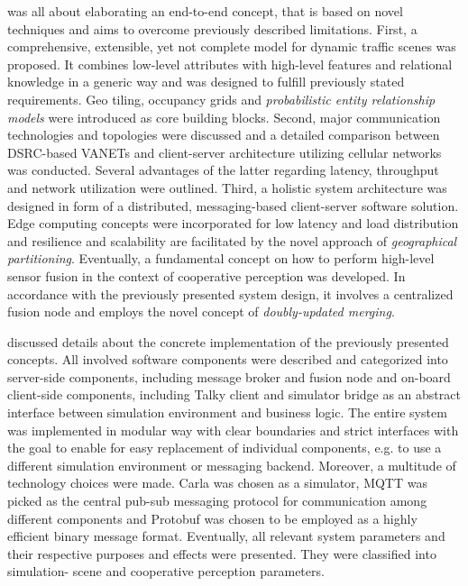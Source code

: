  was all about elaborating an end-to-end concept, that is based on novel techniques and aims to overcome previously described limitations. First, a comprehensive, extensible, yet not complete model for dynamic traffic scenes was proposed. It combines low-level attributes with high-level features and relational knowledge in a generic way and was designed to fulfill previously stated requirements. Geo tiling, occupancy grids and \textit{probabilistic entity relationship models} were introduced as core building blocks.
Second, major communication technologies and topologies were discussed and a detailed comparison between DSRC-based VANETs and client-server architecture utilizing cellular networks was conducted. Several advantages of the latter regarding latency, throughput and network utilization were outlined.
Third, a holistic system architecture was designed in form of a distributed, messaging-based client-server software solution. Edge computing concepts were incorporated for low latency and load distribution and resilience and scalability are facilitated by the novel approach of \textit{geographical partitioning}.
Eventually, a fundamental concept on how to perform high-level sensor fusion in the context of cooperative perception was developed. In accordance with the previously presented system design, it involves a centralized fusion node and employs the novel concept of \textit{doubly-updated merging}. 
\par
\bigskip

 discussed details about the concrete implementation of the previously presented concepts. All involved software components were described and categorized into server-side components, including message broker and fusion node and on-board client-side components, including Talky client and simulator bridge as an abstract interface between simulation environment and business logic. The entire system was implemented in modular way with clear boundaries and strict interfaces with the goal to enable for easy replacement of individual components, e.g. to use a different simulation environment or messaging backend. Moreover, a multitude of technology choices were made. Carla was chosen as a simulator, MQTT was picked as the central pub-sub messaging protocol for communication among different components and Protobuf was chosen to be employed as a highly efficient binary message format. Eventually, all relevant system parameters and their respective purposes and effects were presented. They were classified into simulation- scene and cooperative perception parameters. 
\par
\bigskip

